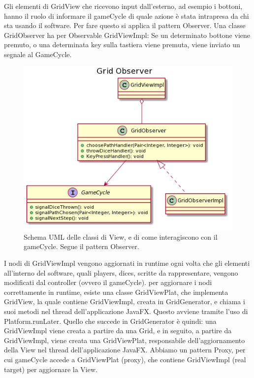 \documentclass[a4paper,12pt]{report}
\begin{document}
Gli elementi di GridView che ricevono input dall’esterno, ad esempio i bottoni, hanno il ruolo di informare il gameCycle di quale azione è stata intrapresa da chi sta usando il software.
%
Per fare questo si applica il pattern Observer.
%
Una classe GridObserver ha per Observable GridViewImpl: Se un determinato bottone viene premuto, o una determinata key sulla tastiera viene premuta, viene inviato un segnale al GameCycle.

\begin{figure}[!t]
\centering{}
\includegraphics[width=\textwidth]{images/miriana/grid_observer.png}
\caption{Schema UML delle classi di View, e di come interagiscono con il gameCycle. Segue il pattern Observer.}
\label{img:gridobserver}
\end{figure}

I nodi di GridViewImpl vengono aggiornati in runtime ogni volta che gli elementi all’interno del software, quali players, dices, scritte da rappresentare, vengono modificati dal controller (ovvero il gameCycle).
%
per aggiornare i nodi correttamente in runtime, esiste una classe GridViewPlat, che implementa GridView, la quale contiene GridViewImpl, creata in GridGenerator, e chiama i suoi metodi nel thread dell’applicazione JavaFX.
%
Questo avviene tramite l’uso di Platform.runLater.
%
Quello che succede in GridGenerator è quindi: una GridViewImpl viene creata a partire da una Grid, e in seguito, a partire da GridViewImpl, viene creata una GridViewPlat, responsabile dell’aggiornamento della View nel thread dell’applicazione JavaFX.
%
Abbiamo un pattern Proxy, per cui gameCycle accede a GridViewPlat (proxy), che contiene GridViewImpl (real target) per aggiornare la View.
\end{document}
